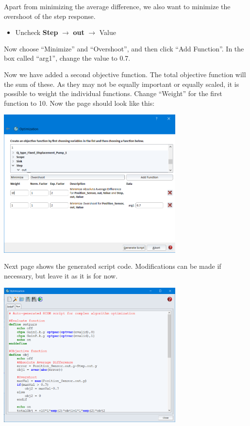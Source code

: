 \documentclass[a4paper,pdftex]{article}
\begin{document}
\begin{tutenumerate}
Apart from minimizing the average difference, we also want to minimize the overshoot of the step response. 
\begin{itemize}
\item Uncheck \textbf{Step} $\rightarrow$ \textbf{out} $\rightarrow$ Value
\end{itemize}

Now choose \enquote{Minimize} and \enquote{Overshoot}, and then click \enquote{Add Function}. In the box called \enquote{arg1}, change the value to 0.7. 

Now we have added a second objective function. The total objective function will the sum of these. As they may not be equally important or equally scaled, it is possible to weight the individual functions.  Change \enquote{Weight} for the first function to 10. Now the page should look like this:

\begin{center}
\includegraphics[width=0.7\textwidth]{gfx/optimization/screenshot-opt3b.png}
\end{center}

\pagebreak
{} 
Next page shows the generated script code. Modifications can be made if necessary, but leave it as it is for now.

\begin{center}
\includegraphics[width=0.7\textwidth]{gfx/optimization/screenshot-opt4.png}
\end{center}


\end{tutenumerate}
\end{document}
